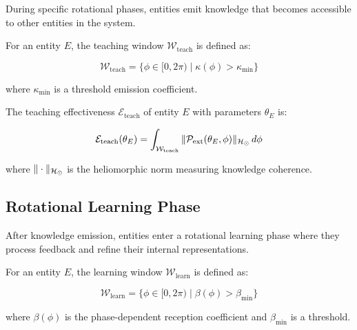 During specific rotational phases, entities emit knowledge that becomes accessible to other entities in the system.

\begin{definition}
For an entity $E$, the teaching window $\mathcal{W}_{\text{teach}}$ is defined as:

\begin{equation}
\mathcal{W}_{\text{teach}} = \{\phi \in [0, 2\pi) \mid \kappa(\phi) > \kappa_{\text{min}}\}
\end{equation}

where $\kappa_{\text{min}}$ is a threshold emission coefficient.
\end{definition}

\begin{proposition}
The teaching effectiveness $\mathcal{E}_{\text{teach}}$ of entity $E$ with parameters $\theta_E$ is:

\begin{equation}
\mathcal{E}_{\text{teach}}(\theta_E) = \int_{\mathcal{W}_{\text{teach}}} \|\mathcal{P}_{\text{ext}}(\theta_E, \phi)\|_{\mathcal{H}_{\odot}} \, d\phi
\end{equation}

where $\|\cdot\|_{\mathcal{H}_{\odot}}$ is the heliomorphic norm measuring knowledge coherence.
\end{proposition}

\subsection{Rotational Learning Phase}

After knowledge emission, entities enter a rotational learning phase where they process feedback and refine their internal representations.

\begin{definition}
For an entity $E$, the learning window $\mathcal{W}_{\text{learn}}$ is defined as:

\begin{equation}
\mathcal{W}_{\text{learn}} = \{\phi \in [0, 2\pi) \mid \beta(\phi) > \beta_{\text{min}}\}
\end{equation}

where $\beta(\phi)$ is the phase-dependent reception coefficient and $\beta_{\text{min}}$ is a threshold.
\end{definition}

